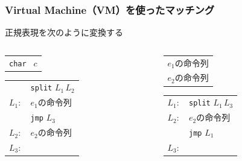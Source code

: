 \documentclass[12pt, unicode, svgnames]{beamer}
\begin{document}
\begin{frame}[fragile]
  \frametitle{Virtual Machine（VM）を使ったマッチング}

  正規表現を次のように変換する

  \begin{center}
    \begin{columns}
      \begin{column}{0.4\textwidth}
        \begin{Ldescription}
          \item<2->[文字（$c$）]
            \begin{tabular}{l}
              \texttt{char } $c$ \\
            \end{tabular}

          \item<4->[選択（$e_1 \mid e_2$）]
            \begin{tabular}{cl}
                     & \texttt{split} $L_1\, L_2$  \\
              $L_1:$ & $e_1$の命令列 \\
                     & \texttt{jmp} $L_3$ \\
              $L_2:$ & $e_2$の命令列 \\
              $L_3:$ & \\
            \end{tabular}
        \end{Ldescription}
      \end{column}
      \begin{column}{0.4\textwidth}
        \begin{Ldescription}
          \item<3->[連結（$e_1e_2$）]
            \begin{tabular}{l}
              $e_1$の命令列 \\
              $e_2$の命令列 \\
            \end{tabular}

          \item<5->[繰り返し（$e*$）]
            \begin{tabular}{cl}
              $L_1:$ & \texttt{split} $L_1\, L_3$  \\
              $L_2:$ & $e_2$の命令列 \\
                     & \texttt{jmp} $L_1$ \\
              $L_3:$ & \\
            \end{tabular}
        \end{Ldescription}
      \end{column}
    \end{columns}
  \end{center}
\end{frame}
\end{document}
